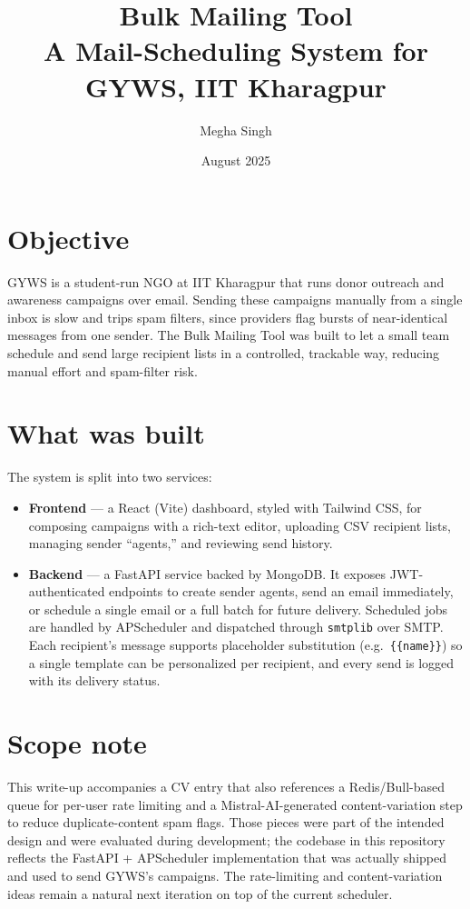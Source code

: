 \documentclass[11pt]{article}
\title{\vspace{-1.5cm}Bulk Mailing Tool \\ \large A Mail-Scheduling System for GYWS, IIT Kharagpur}
\author{Megha Singh}
\date{August 2025}
\begin{document}
\maketitle
\vspace{-0.8cm}

\section*{Objective}
GYWS is a student-run NGO at IIT Kharagpur that runs donor outreach and awareness campaigns over email.
Sending these campaigns manually from a single inbox is slow and trips spam filters, since providers flag
bursts of near-identical messages from one sender. The Bulk Mailing Tool was built to let a small team
schedule and send large recipient lists in a controlled, trackable way, reducing manual effort and
spam-filter risk.

\section*{What was built}
The system is split into two services:

\begin{itemize}[nosep]
  \item \textbf{Frontend} — a React (Vite) dashboard, styled with Tailwind CSS, for composing campaigns
  with a rich-text editor, uploading CSV recipient lists, managing sender ``agents,'' and reviewing send
  history.
  \item \textbf{Backend} — a FastAPI service backed by MongoDB. It exposes JWT-authenticated endpoints to
  create sender agents, send an email immediately, or schedule a single email or a full batch for future
  delivery. Scheduled jobs are handled by APScheduler and dispatched through \texttt{smtplib} over SMTP.
  Each recipient's message supports placeholder substitution (e.g.\ \texttt{\{\{name\}\}}) so a single
  template can be personalized per recipient, and every send is logged with its delivery status.
\end{itemize}

\section*{Scope note}
This write-up accompanies a CV entry that also references a Redis/Bull-based queue for per-user rate
limiting and a Mistral-AI-generated content-variation step to reduce duplicate-content spam flags. Those
pieces were part of the intended design and were evaluated during development; the codebase in this
repository reflects the FastAPI + APScheduler implementation that was actually shipped and used to send
GYWS's campaigns. The rate-limiting and content-variation ideas remain a natural next iteration on top of
the current scheduler.
\end{document}
